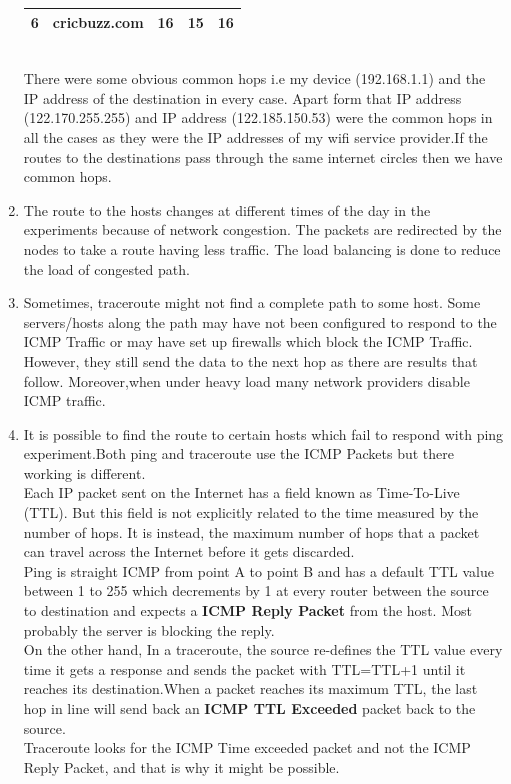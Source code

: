 \documentclass[a4paper,11pt]{article}
\begin{document}
\begin{enumerate}[itemsep=-3pt,label=(\alph*)]
\begin{tabular}{|c|c|c|c|c|}
		   \rowcolor[RGB]{0, 247, 255}
		6&cricbuzz.com & 16 & 15 &16
		\\ \hline
	\end{tabular}
    \\There were some obvious common hops i.e my device (192.168.1.1) and the IP address of the destination in every case. Apart form that IP address (122.170.255.255) and IP address (122.185.150.53) were the common hops in all the cases as they were the IP addresses of my wifi service provider.If the routes to the destinations pass through the same internet circles then we have common hops.
	\item The route to the hosts changes at different times of the day in the experiments because of network congestion. The packets are redirected by the nodes to take a route having less traffic. The load balancing is done to reduce the load of congested path.
	
	\item Sometimes, traceroute might not find a complete path to some host. Some servers/hosts along the path may have not been configured to respond to the ICMP Traffic or may have set up firewalls which block the ICMP Traffic. However, they still send the data to the next hop as there are results that follow. Moreover,when under heavy load many network providers disable ICMP traffic.
	
	\item It is possible to find the route to certain hosts which fail to respond with ping experiment.Both ping and traceroute use the ICMP Packets but there working is different.
	\\Each IP packet sent on the Internet has a field known as Time-To-Live (TTL). But this field is not explicitly related to the time measured by the number of hops. It is instead, the maximum number of hops that a packet can travel across the Internet before it gets discarded.\\Ping is straight ICMP from point A to point B and has a default TTL value between 1 to 255 which decrements by 1 at every router between the source to destination and expects a \textbf{ICMP Reply Packet} from the host. Most probably the server is blocking the reply.\\ On the other hand, In a traceroute, the source re-defines the TTL value every time it gets a response and sends the packet with TTL=TTL+1 until it reaches its destination.When a packet reaches its maximum TTL, the last hop in line will send back an \textbf{ICMP TTL Exceeded} packet back to the source.\\ Traceroute looks for the ICMP Time exceeded packet and not the ICMP Reply Packet, and that is why it might be possible.
	
	
\end{enumerate}
\end{document}
